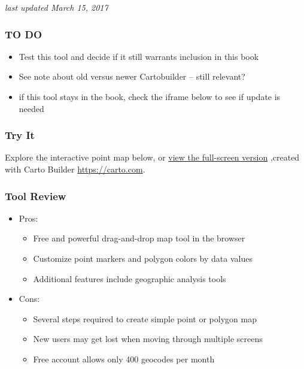\documentclass[
  english,
]{book}
\providecommand{\tightlist}{%
  \setlength{\itemsep}{0pt}\setlength{\parskip}{0pt}}
\begin{document}
\emph{last updated March 15, 2017}

\hypertarget{to-do}{%
\subsubsection*{TO DO}\label{to-do}}

\begin{itemize}
\tightlist
\item
  Test this tool and decide if it still warrants inclusion in this book
\item
  See note about old versus newer Cartobuilder -- still relevant?
\item
  if this tool stays in the book, check the iframe below to see if update is needed
\end{itemize}

\hypertarget{try-it-3}{%
\subsubsection*{Try It}\label{try-it-3}}

Explore the interactive point map below, or \href{https://jackdougherty.carto.com/builder/1abbb430-ec89-11e6-a661-0e05a8b3e3d7/embed}{view the full-screen version} ,created with Carto Builder \url{https://carto.com}.

\hypertarget{tool-review-3}{%
\subsubsection*{Tool Review}\label{tool-review-3}}

\begin{itemize}
\tightlist
\item
  Pros:

  \begin{itemize}
  \tightlist
  \item
    Free and powerful drag-and-drop map tool in the browser
  \item
    Customize point markers and polygon colors by data values
  \item
    Additional features include geographic analysis tools
  \end{itemize}
\item
  Cons:

  \begin{itemize}
  \tightlist
  \item
    Several steps required to create simple point or polygon map
  \item
    New users may get lost when moving through multiple screens
  \item
    Free account allows only 400 geocodes per month
  \end{itemize}
\end{itemize}
\end{document}
